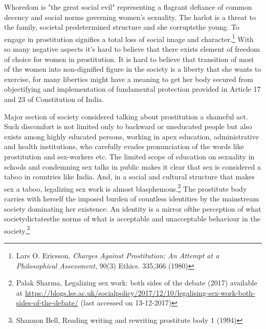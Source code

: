 \begin{multicols}{2}
\vspace{-.15cm}

\noi
Whoredom is "the great social evil" representing a flagrant defiance of common decency and
social norms governing women’s sexuality. The harlot is a threat to the family, societal predetermined structure and she corruptsthe young. To engage in prostitution signifies a total loss
of social image and character.\footnote{Lars O. Ericsson, \textit{Charges Against Prostitution: An Attempt at a Philosophical Assessment,} 90(3) Ethics. 335,366 (1980)} With so many negative aspects it’s hard to believe that there exists element of freedom of choice for women in prostitution. It is hard to believe that transition of most of the women into non-dignified figure in the society is a liberty that she
wants to exercise, for many liberties might have a meaning to get her body secured from
objectifying and implementation of fundamental protection provided in Article 17 and 23 of
Constitution of India.

\vspace{-.15cm}


\vspace{-.1cm}

\noi
Major section of society considered talking about prostitution a shameful act. Such discomfort
is not limited only to backward or uneducated people but also exists among highly educated
persons, working in apex education, administrative and health institutions, who carefully
evades pronunciation of the words like prostitution and sex-workers etc. The limited scope of
education on sexuality in schools and condemning sex talks in public makes it clear that sex is
considered a taboo in countries like India. And, in a social and cultural structure that makes sex
a taboo, legalizing sex work is almost blasphemous.\footnote{Palak Sharma, Legalizing sex work: both sides of the debate (2017) available at \url{https://blogs.lse.ac.uk/socialpolicy/2017/12/10/legalising-sex-work-both-sides-of-the-debate/} (last accessed on 13-12-2017)} The prostitute body carries with herself
the imposed burden of countless identities by the mainstream society dominating her existence.
An identity is a mirror ofthe perception of what societydictatesthe norms of what is acceptable
and unacceptable behaviour in the society.\footnote{Shannon Bell, Reading writing and rewriting prostitute body 1 (1994)}

\vspace{-.15cm}


\end{multicols}
